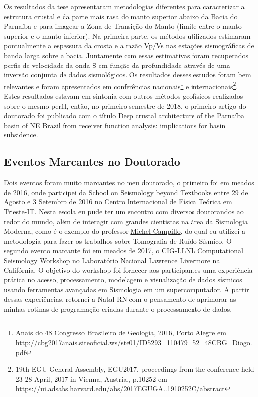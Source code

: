 \documentclass[10pt,a4paper,oneside]{book}
\begin{document}
Os resultados da tese apresentaram metodologias diferentes para caracterizar a estrutura crustal e da parte mais rasa do manto superior abaixo da Bacia do Parnaíba e para imagear a Zona de Transição do Manto (limite entre o manto superior e o manto inferior). Na primeira parte, os métodos utilizados estimaram pontualmente a espessura da crosta e a razão Vp/Vs nas estações sismográficas de banda larga sobre a bacia. Juntamente com essas estimativas foram recuperados perfis de velocidade da onda S em função da profundidade através de uma inversão conjunta de dados sismológicos. Os resultados desses estudos foram bem relevantes e foram apresentados em conferências nacionais\footnote{Anais do 48 Congresso Brasileiro de Geologia, 2016, Porto Alegre em \url{http://cbg2017anais.siteoficial.ws/ste01/ID5293_110479_52_48CBG_Diogo.pdf}} e internacionais\footnote{19th EGU General Assembly, EGU2017, proceedings from the conference held 23-28 April, 2017 in Vienna, Austria., p.10252 em \url{https://ui.adsabs.harvard.edu/abs/2017EGUGA..1910252C/abstract}}. Estes resultados estavam em sintonia com outros métodos geofísicos realizados sobre o mesmo perfil, então, no primeiro semestre de 2018, o primeiro artigo do doutorado foi publicado com o título \href{https://doi.org/10.1144/SP472.8}{Deep crustal architecture of the Parnaíba basin of NE Brazil from receiver function analysis: implications for basin subsidence}.

\subsection{Eventos Marcantes no Doutorado}
\label{sec_ev_doc}

Dois eventos foram muito marcantes no meu doutorado, o primeiro foi em meados de 2016, onde participei da \href{https://indico.ictp.it/event/7615/material/11/0.jpg}{School on Seismology beyond Textbooks} entre 29 de Agosto e 3 Setembro de 2016 no Centro Internacional de Física Teórica em Trieste-IT. Nesta escola eu pude ter um encontro com diversos doutorandos ao redor do mundo, além de interagir com grandes cientistas na área da Sismologia Moderna, como é o exemplo do professor \href{https://scholar.google.fr/citations?user=ZCRP01AAAAAJ&hl=fr}{Michel Campillo}, do qual eu utilizei a metodologia para fazer os trabalhos sobre Tomografia de Ruído Sísmico. O segundo evento marcante foi em meados de 2017, o \href{https://geodynamics.org/events/details/218}{CIG-LLNL Computational Seismology Workshop} no Laboratório Nacional Lawrence Livermore na Califórnia. O objetivo do workshop foi fornecer aos participantes uma experiência prática no acesso, processamento, modelagem e visualização de dados sísmicos usando ferramentas avançadas em Sismologia em um supercomputador. A partir dessas experiências, retornei a Natal-RN com o pensamento de aprimorar as minhas rotinas de programação criadas durante o processamento de dados. 
\end{document}
